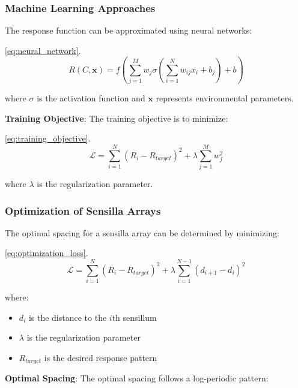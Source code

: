 \documentclass[
  13pt,
  a4paperpaper,
  12pt]{article}
\providecommand{\tightlist}{%
  \setlength{\itemsep}{0pt}\setlength{\parskip}{0pt}}
\begin{document}
\subsubsection{Machine Learning
Approaches}\label{machine-learning-approaches}

The response function can be approximated using neural networks:

\eqref{eq:neural_network}. \begin{equation}
R(C, \mathbf{x}) = f\left(\sum_{j=1}^{M} w_j \sigma\left(\sum_{i=1}^{N} w_{ij} x_i + b_j\right) + b\right) \label{eq:neural_network}
\end{equation}

where \(\sigma\) is the activation function and \(\mathbf{x}\)
represents environmental parameters.

\textbf{Training Objective}: The training objective is to minimize:

\eqref{eq:training_objective}. \begin{equation}
\mathcal{L} = \sum_{i=1}^{N} \left(R_i - R_{target}\right)^2 + \lambda \sum_{j=1}^{M} w_j^2 \label{eq:training_objective}
\end{equation}

where \(\lambda\) is the regularization parameter.

\subsubsection{Optimization of Sensilla
Arrays}\label{optimization-of-sensilla-arrays}

The optimal spacing for a sensilla array can be determined by
minimizing:

\eqref{eq:optimization_loss}. \begin{equation}
\mathcal{L} = \sum_{i=1}^{N} \left(R_i - R_{target}\right)^2 + \lambda \sum_{i=1}^{N-1} (d_{i+1} - d_i)^2 \label{eq:optimization_loss}
\end{equation}

where:

\begin{itemize}
\tightlist
\item
  \(d_i\) is the distance to the \(i\)th sensillum
\item
  \(\lambda\) is the regularization parameter
\item
  \(R_{target}\) is the desired response pattern
\end{itemize}

\textbf{Optimal Spacing}: The optimal spacing follows a log-periodic
pattern:
\end{document}
